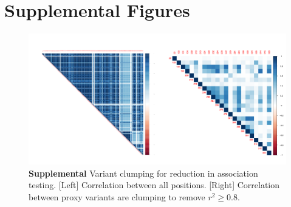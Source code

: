 \documentclass{article}
\begin{document}




\section{Supplemental Figures}

									
\begin{figure}[ht] \hspace{-0.5cm} 
    \includegraphics[scale=0.85]{S1}
	\caption{\textbf{Supplemental} Variant clumping for reduction in association testing. [Left] Correlation between all positions. [Right] Correlation between proxy variants are clumping to remove $r^2 \ge 0.8$.}
	\label{fig:S1}
\end{figure}
\end{document}
